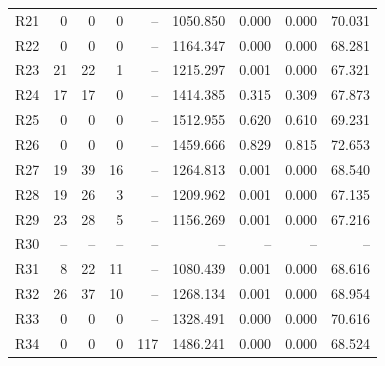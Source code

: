 \begin{longtable}{lrrrrrrrr}
R21 & 0 & 0 & 0 & -- & 1050.850 & 0.000 & 0.000 & 70.031\\
R22 & 0 & 0 & 0 & -- & 1164.347 & 0.000 & 0.000 & 68.281\\
R23 & 21 & 22 & 1 & -- & 1215.297 & 0.001 & 0.000 & 67.321\\
R24 & 17 & 17 & 0 & -- & 1414.385 & 0.315 & 0.309 & 67.873\\
R25 & 0 & 0 & 0 & -- & 1512.955 & 0.620 & 0.610 & 69.231\\
R26 & 0 & 0 & 0 & -- & 1459.666 & 0.829 & 0.815 & 72.653\\
R27 & 19 & 39 & 16 & -- & 1264.813 & 0.001 & 0.000 & 68.540\\
R28 & 19 & 26 & 3 & -- & 1209.962 & 0.001 & 0.000 & 67.135\\
R29 & 23 & 28 & 5 & -- & 1156.269 & 0.001 & 0.000 & 67.216\\
R30 & -- & -- & -- & -- & -- & -- & -- & --\\
R31 & 8 & 22 & 11 & -- & 1080.439 & 0.001 & 0.000 & 68.616\\
R32 & 26 & 37 & 10 & -- & 1268.134 & 0.001 & 0.000 & 68.954\\
R33 & 0 & 0 & 0 & -- & 1328.491 & 0.000 & 0.000 & 70.616\\
R34 & 0 & 0 & 0 & 117 & 1486.241 & 0.000 & 0.000 & 68.524\\
\end{longtable}
\clearpage
